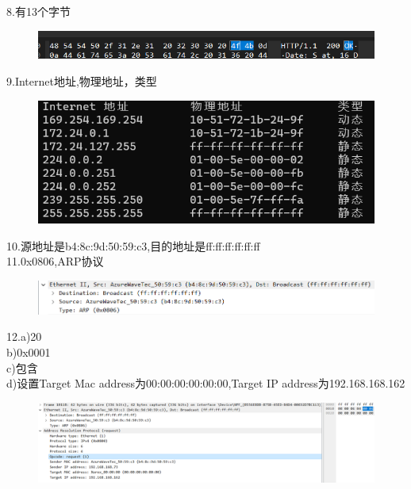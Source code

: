 \documentclass{article}
\begin{document}
8.有13个字节\\
\begin{figure}[htbp]
    \centering
    \includegraphics[width=1\textwidth]{pic/p6.png} %
\end{figure}

9.Internet地址,物理地址，类型\\
\begin{figure}[htbp]
    \centering
    \includegraphics[width=1\textwidth]{pic/p7.png} %
\end{figure}
\newpage
10.源地址是b4:8c:9d:50:59:c3,目的地址是ff:ff:ff:ff:ff:ff\\
11.0x0806,ARP协议\\
\begin{figure}[htbp]
    \centering
    \includegraphics[width=1\textwidth]{pic/new1.png} %
\end{figure}

12.a)20\\
   b)0x0001\\
   c)包含\\
   d)设置Target Mac address为00:00:00:00:00:00,Target IP address为192.168.168.162
\begin{figure}[htbp]
    \centering
    \includegraphics[width=1\textwidth]{pic/new2.png} %
\end{figure}
\end{document}
